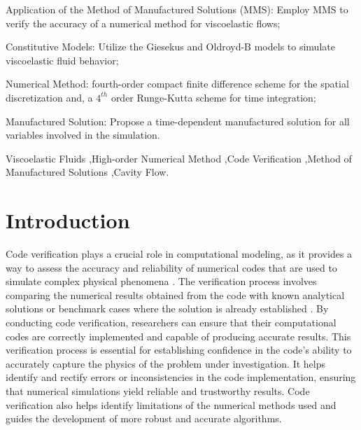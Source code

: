 \documentclass[preprint, 12pt]{elsarticle}
\begin{document}
\begin{frontmatter}

\begin{highlights}
 \item Application of the Method of Manufactured Solutions (MMS): Employ MMS to verify the accuracy of a numerical method for viscoelastic flows;
 \item Constitutive Models: Utilize the Giesekus and Oldroyd-B models to simulate viscoelastic fluid behavior;
 \item Numerical Method: fourth-order compact finite difference scheme for the spatial discretization and, a $4^{th}$ order Runge-Kutta scheme for time integration;
 \item Manufactured Solution: Propose a time-dependent manufactured solution for all variables involved in the simulation.
\end{highlights}

\begin{keyword}
Viscoelastic Fluids \sep High-order Numerical Method \sep Code Verification \sep Method of Manufactured Solutions \sep Cavity Flow.
\end{keyword}

\end{frontmatter}


\section{Introduction}
\label{sec:Introduction}


Code verification plays a crucial role in computational modeling, as it provides a way to assess the accuracy and reliability of numerical codes that are used to simulate complex physical phenomena \cite{Khoshghalb2019, Tranquilli2022}. The verification process involves comparing the numerical results obtained from the code with known analytical solutions or benchmark cases where the solution is already established \cite{Fernandes2018, Pedro2020}. By conducting code verification, researchers can ensure that their computational codes are correctly implemented and capable of producing accurate results. This verification process is essential for establishing confidence in the code's ability to accurately capture the physics of the problem under investigation. It helps identify and rectify errors or inconsistencies in the code implementation, ensuring that numerical simulations yield reliable and trustworthy results. Code verification also helps identify limitations of the numerical methods used and guides the development of more robust and accurate algorithms. 
\end{document}
